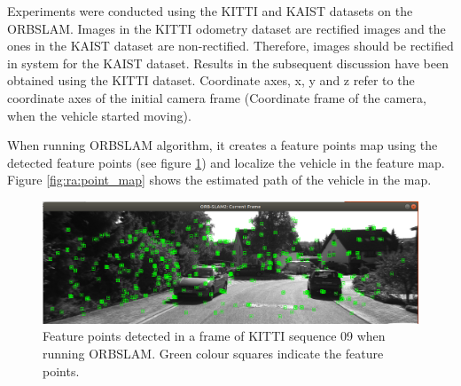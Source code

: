 Experiments were conducted using the \gls{KITTI} and \gls{KAIST} datasets on the \gls{ORBSLAM}. Images in the \gls{KITTI} odometry dataset are rectified images and the ones in the \gls{KAIST} dataset are non-rectified. Therefore, images should be rectified in system for the \gls{KAIST} dataset. Results in the subsequent discussion have been obtained using the \gls{KITTI} dataset. Coordinate axes, x, y and z refer to the coordinate axes of the initial camera frame (Coordinate frame of the camera, when the vehicle started moving).

When running \gls{ORBSLAM} algorithm, it creates a feature points map using the detected feature points (see figure \ref{fig:ra:detected_features}) and localize the vehicle in the feature map. Figure \ref{fig:ra:point_map} shows the estimated path of the vehicle in the map.
\begin{figure}[h]
	\centering
	\includegraphics[width=\textwidth]{figs/detected_features.png}
	\vspace{-0.5cm}
	\caption[Detected feature points]{Feature points detected in a frame of \gls{KITTI} sequence 09 when running \gls{ORBSLAM}. Green colour squares indicate the feature points.}
	\label{fig:ra:detected_features}
	\vspace{0.5cm}
\end{figure}
